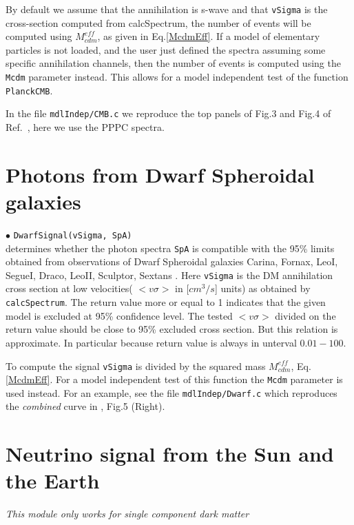 \documentclass[12pt,a4paper]{article}
\begin{document}
By default we assume that the annihilation is s-wave and that  {\tt vSigma} is the cross-section computed from calcSpectrum, the number of events will be computed using  $M_{cdm}^{eff}$, as given in  Eq.\ref{McdmEff}.
  If  a model of elementary particles is not loaded,  and the user just defined the spectra assuming some specific annihilation channels, then the number of events is computed using the {\tt Mcdm} parameter instead.  This  allows for a  model independent  test of the  function  {\tt PlanckCMB}. 
 
In the file {\tt mdlIndep/CMB.c} we reproduce the top panels of Fig.3 and Fig.4 of Ref.~\cite{Slatyer_2016}, here we use the PPPC spectra.


\section{ Photons from Dwarf Spheroidal galaxies}

\noindent
$\bullet$ \verb|DwarfSignal(vSigma, SpA)|\\
determines whether the photon spectra {\tt SpA}  is compatible with the 95\% limits obtained from 
observations of Dwarf Spheroidal galaxies  Carina, Fornax, LeoI, SegueI,  Draco, LeoII,
 Sculptor, Sextans
 \cite{Albert_2017, Bonnivard_2015, Alvarez_2020}. Here {\tt vSigma} is the  DM annihilation cross section at low velocities( $<v\sigma>$  in [$cm^3/s$] units)  as obtained by \verb|calcSpectrum|.  
 The return value more or equal to 1  indicates  that the given model is excluded at 95\% confidence level. 
 The tested $<v\sigma>$ divided  on the return value should be close to 95\% excluded cross section. But this relation is approximate. In particular because
 return value is always  in unterval $0.01 - 100$.

To compute  the signal {\tt vSigma} is  divided by the  squared mass $M_{cdm}^{eff}$, Eq.\ref{McdmEff}. For a model independent test of this function
the {\tt Mcdm} parameter is used instead. For an example,  see the file {\tt mdlIndep/Dwarf.c}  which reproduces  the  {\it combined} curve  in \cite{Alvarez_2020},  Fig.5 (Right).


\section{Neutrino signal from the Sun and the Earth }
\label{sec:neutrino}

\begin{center}
{\it This module only works for single component dark matter}
\end{center}
\end{document}
